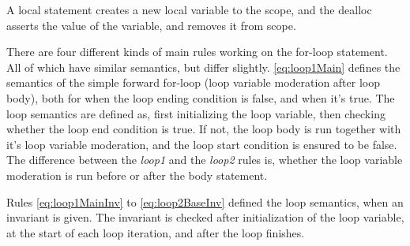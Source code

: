 A local statement creates a new local variable to the scope, and
the dealloc asserts the value of the variable, and removes it from scope.

There are four different kinds of main rules working on the for-loop statement. All of which
have similar semantics, but differ slightly.
\eqref{eq:loop1Main} defines the semantics of the simple
forward for-loop (loop variable moderation after loop body), both for when the loop ending
condition is false, and when it's true. The loop semantics are defined as, first initializing
the loop variable, then checking whether the loop end condition is true. If not, the loop body
is run together with it's loop variable moderation, and the loop start condition is ensured to
be false. The difference between the \emph{loop1} and the \emph{loop2} rules is, whether
the loop variable moderation is run before or after the body statement.

Rules \eqref{eq:loop1MainInv} to \eqref{eq:loop2BaseInv} defined the loop semantics, when an
invariant is given. The invariant is checked after initialization of the loop variable, at
the start of each loop iteration, and after the loop finishes.

